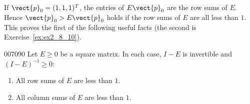 If $\vect{p}_{0} = (1, 1, 1)^{T}$, the entries of $E\vect{p}_{0}$ are the row sums of $E$. Hence $\vect{p}_{0} > E\vect{p}_{0}$ holds if the row sums of $E$ are all less than $1$. This proves the first of the following useful facts (the second is Exercise~\ref{ex:ex2_8_10}).

\begin{corollary}{}{007090}
Let $E \geq 0$ be a square matrix. In each case, $I - E$ is invertible and $(I - E)^{-1} \geq 0$:

\begin{enumerate}
\item All row sums of $E$ are less than $1$.

\item All column sums of $E$ are less than $1$.

\end{enumerate}
\end{corollary}
